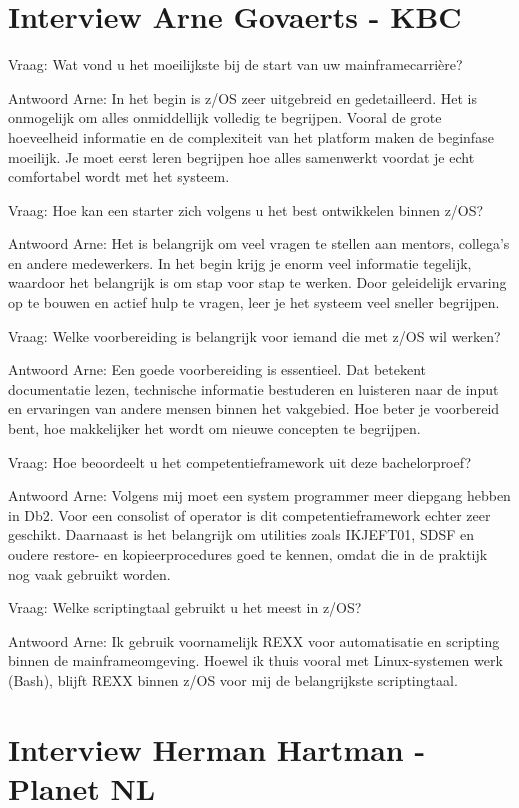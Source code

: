 \section{Interview Arne Govaerts - KBC}

Vraag: Wat vond u het moeilijkste bij de start van uw mainframecarrière?

Antwoord Arne: In het begin is z/OS zeer uitgebreid en gedetailleerd. Het is onmogelijk om alles onmiddellijk volledig te begrijpen. Vooral de grote hoeveelheid informatie en de complexiteit van het platform maken de beginfase moeilijk. Je moet eerst leren begrijpen hoe alles samenwerkt voordat je echt comfortabel wordt met het systeem.

Vraag: Hoe kan een starter zich volgens u het best ontwikkelen binnen z/OS?

Antwoord Arne: Het is belangrijk om veel vragen te stellen aan mentors, collega’s en andere medewerkers. In het begin krijg je enorm veel informatie tegelijk, waardoor het belangrijk is om stap voor stap te werken. Door geleidelijk ervaring op te bouwen en actief hulp te vragen, leer je het systeem veel sneller begrijpen.

Vraag: Welke voorbereiding is belangrijk voor iemand die met z/OS wil werken?

Antwoord Arne: Een goede voorbereiding is essentieel. Dat betekent documentatie lezen, technische informatie bestuderen en luisteren naar de input en ervaringen van andere mensen binnen het vakgebied. Hoe beter je voorbereid bent, hoe makkelijker het wordt om nieuwe concepten te begrijpen.

Vraag: Hoe beoordeelt u het competentieframework uit deze bachelorproef?

Antwoord Arne: Volgens mij moet een system programmer meer diepgang hebben in Db2. Voor een consolist of operator is dit competentieframework echter zeer geschikt. Daarnaast is het belangrijk om utilities zoals IKJEFT01, SDSF en oudere restore- en kopieerprocedures goed te kennen, omdat die in de praktijk nog vaak gebruikt worden.

Vraag: Welke scriptingtaal gebruikt u het meest in z/OS? 

Antwoord Arne: Ik gebruik voornamelijk REXX voor automatisatie en scripting binnen de mainframeomgeving. Hoewel ik thuis vooral met Linux-systemen werk (Bash), blijft REXX binnen z/OS voor mij de belangrijkste scriptingtaal.

\section{Interview Herman Hartman - Planet NL}

